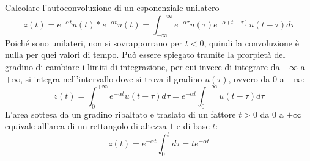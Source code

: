 \documentclass{article}
\begin{document}
\begin{center}
\end{center}

Calcolare l'autoconvoluzione di un esponenziale unilatero
\begin{equation*}
    z(t)=e^{-\alpha t}u(t)*e^{-\alpha t}u(t)=\displaystyle\int_{-\infty}^{+\infty}e^{-\alpha\tau}u(\tau)e^{-\alpha(t-\tau)}u(t-\tau)d\tau
\end{equation*}
Poiché sono unilateri, non si sovrapporrano per $t<0$, quindi la convoluzione è nulla per quei valori di tempo. Può essere spiegato tramite la prorpietà del gradino di 
cambiare i limiti di integrazione, per cui invece di integrare da $-\infty$ a $+\infty$, si integra nell'intervallo dove si trova il gradino $u(\tau)$, ovvero da $0$ a $+\infty$: 
\begin{equation*}
    z(t)=\displaystyle\int_0^{+\infty}e^{-\alpha t}u(t-\tau)d\tau=e^{-\alpha t}\int_0^{+\infty}u(t-\tau)d\tau
\end{equation*}
L'area sottesa da un gradino ribaltato e traslato di un fattore $t>0$ da $0$ a $+\infty$ equivale all'area di un rettangolo di altezza $1$ e di base $t$:
\begin{equation*}
    z(t)=e^{-\alpha t}\displaystyle\int_0^td\tau=te^{-\alpha t}
\end{equation*}
\end{document}
